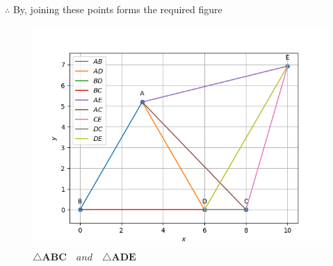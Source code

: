 \documentclass[11pt, a4paper]{article}
\let\vec\mathbf
\begin{document}
\begin{enumerate}
\begin{enumerate}[label=(\roman*)]
$\therefore$ By, joining these points forms the required figure

\end{enumerate}
\begin{figure}[H]
    \includegraphics[width=\columnwidth]{figs/Final_python.png}
	\caption{$\triangle \vec{ABC} \hspace{12pt} and \hspace{12pt} \triangle \vec{ADE}$}
    \label{fig:fig2}
\end{figure}
\end{enumerate}
\end{document}
